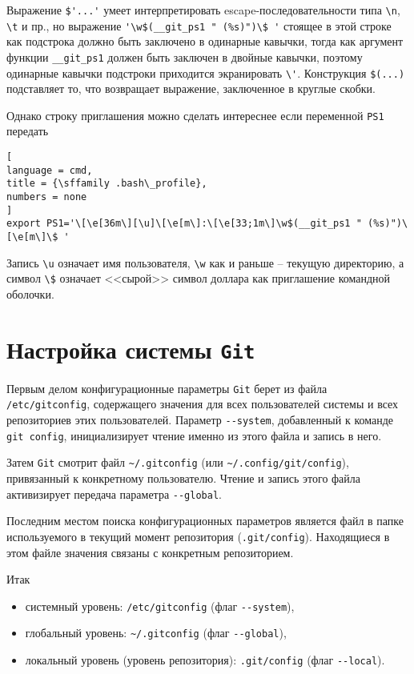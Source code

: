 \documentclass[%
	11pt,
	a4paper,
	utf8,
		]{article}
\begin{document}
Выражение \verb|$'...'| умеет интерпретировать escape-последовательности типа \verb|\n|, \verb|\t| и пр., но выражение \verb|'\w$(__git_ps1 " (%s)")\$ '| стоящее в этой строке как подстрока должно быть заключено в одинарные кавычки, тогда как аргумент функции \verb|__git_ps1| должен быть заключен в двойные кавычки, поэтому одинарные кавычки подстроки приходится экранировать \verb|\'|. Конструкция \verb|$(...)| подставляет то, что возвращает выражение, заключенное в круглые скобки.

Однако строку приглашения можно сделать интереснее если переменной \texttt{PS1} передать
\begin{lstlisting}[
language = cmd,
title = {\sffamily .bash\_profile},
numbers = none
]
export PS1='\[\e[36m\][\u]\[\e[m\]:\[\e[33;1m\]\w$(__git_ps1 " (%s)")\[\e[m\]\$ '
\end{lstlisting}

Запись \verb|\u| означает имя пользователя, \verb|\w| как и раньше -- текущую директорию, а символ \verb|\$| означает <<сырой>> символ доллара как приглашение командной оболочки.

\section{Настройка системы \texttt{Git}}

Первым делом конфигурационные параметры \texttt{Git} берет из файла \texttt{/etc/gitconfig}, содержащего значения для всех пользователей системы и всех репозиториев этих пользователей. Параметр \verb|--system|, добавленный к команде \texttt{git config}, инициализирует чтение именно из этого файла и запись в него.

Затем \texttt{Git} смотрит файл \verb|~/.gitconfig| (или \verb|~/.config/git/config|), привязанный к конкретному пользователю. Чтение и запись этого файла активизирует передача параметра \verb|--global|.

Последним местом поиска конфигурационных параметров является файл в папке используемого в текущий момент репозитория (\verb|.git/config|). Находящиеся в этом файле значения связаны с конкретным репозиторием.

Итак
\begin{itemize}
	\item системный уровень: \verb|/etc/gitconfig| (флаг \verb|--system|),
	
	\item глобальный уровень: \verb|~/.gitconfig| (флаг \verb|--global|),
	
	\item локальный уровень (уровень репозитория): \verb|.git/config| (флаг \verb|--local|).
\end{itemize}
\end{document}
